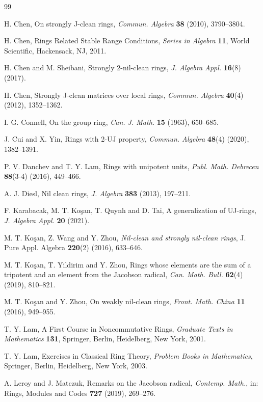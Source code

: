 \documentclass[12pt]{amsart}
\theoremstyle{definition}
\begin{document}
\vskip1.0pc

\begin{thebibliography}{99}

H. Chen, On strongly J-clean rings, \textit{Commun. Algebra} {\bf 38} (2010), 3790--3804.

H. Chen, Rings Related Stable Range Conditions, \textit{Series in Algebra} {\bf 11}, World Scientific, Hackensack, NJ, 2011.

H. Chen and M. Sheibani, Strongly 2-nil-clean rings, \textit{J. Algebra Appl.} {\bf 16}(8) (2017).

H. Chen, Strongly J-clean matrices over local rings, \textit{Commun. Algebra} {\bf 40}(4) (2012), 1352--1362.

I. G. Connell, On the group ring, \textit{Can. J. Math.} {\bf 15} (1963), 650--685.

J. Cui and X. Yin, Rings with 2-UJ property, \textit{Commun. Algebra} {\bf 48}(4) (2020), 1382--1391.

P. V. Danchev and T. Y. Lam, Rings with unipotent units, \textit{Publ. Math. Debrecen} {\bf 88}(3-4) (2016), 449--466.

A. J. Diesl, Nil clean rings, \textit{J. Algebra} {\bf 383} (2013), 197--211.

F. Karabacak, M. T. Ko\c{s}an, T. Quynh and D. Tai, A generalization of UJ-rings, \textit{J. Algebra Appl.} {\bf 20} (2021).

M. T. Ko\c{s}an, Z. Wang and Y. Zhou, {\it Nil-clean and strongly nil-clean rings}, J. Pure Appl. Algebra {\bf 220}(2) (2016), 633--646.

M. T. Ko\c{s}an, T. Yildirim and Y. Zhou, Rings whose elements are the sum of a tripotent and an element from the Jacobson radical, \textit{Can. Math. Bull.} {\bf 62}(4) (2019), 810--821.

M. T. Ko\c{s}an and Y. Zhou, On weakly nil-clean rings, \textit{Front. Math. China} {\bf 11} (2016), 949--955.

T. Y. Lam, A First Course in Noncommutative Rings, \textit{Graduate Texts in Mathematics} {\bf 131}, Springer, Berlin, Heidelberg, New York, 2001.

T. Y. Lam, Exercises in Classical Ring Theory, \textit{Problem Books in Mathematics}, Springer, Berlin, Heidelberg, New York, 2003.

A. Leroy and J. Matczuk, Remarks on the Jacobson radical, \textit{Contemp. Math.}, in: Rings, Modules and Codes {\bf 727} (2019), 269--276.


\end{thebibliography}
\end{document}
